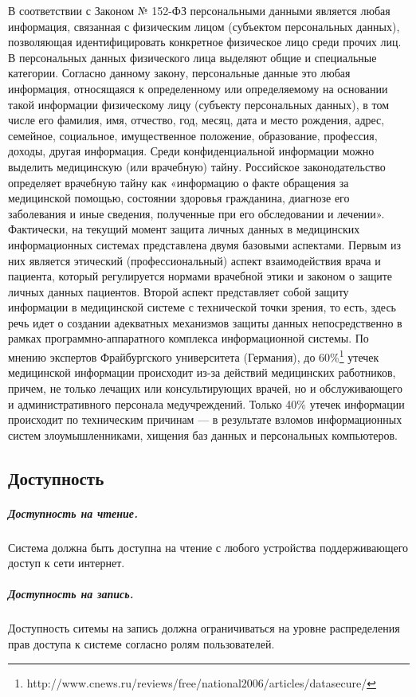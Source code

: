 В соответствии с Законом № 152-ФЗ персональными данными является любая
информация, связанная с физическим лицом (субъектом персональных данных),
позволяющая идентифицировать конкретное физическое лицо среди прочих лиц. В
персональных данных физического лица выделяют общие и специальные категории.
Согласно данному закону, персональные данные это любая информация, относящаяся к
определенному или определяемому на основании такой информации физическому лицу
(субъекту персональных данных), в том числе его фамилия, имя, отчество, год,
месяц, дата и место рождения, адрес, семейное, социальное, имущественное
положение, образование, профессия, доходы, другая информация.
Среди конфиденциальной информации можно выделить медицинскую (или врачебную)
тайну. Российское законодательство определяет врачебную тайну как «информацию о
факте обращения за медицинской помощью, состоянии здоровья гражданина, диагнозе
его заболевания и иные сведения, полученные при его обследовании и лечении».
Фактически, на текущий момент защита личных данных в медицинских информационных
системах представлена  двумя базовыми аспектами.
Первым из них является этический (профессиональный) аспект взаимодействия врача
и пациента, который регулируется нормами врачебной этики и законом о защите
личных данных пациентов.
Второй аспект представляет собой защиту информации в медицинской системе с
технической точки зрения, то есть, здесь речь идет о создании адекватных
механизмов защиты данных непосредственно в рамках программно-аппаратного
комплекса информационной системы.
По мнению экспертов Фрайбургского университета (Германия), до 60\%\footnote{
	http://www.cnews.ru/reviews/free/national2006/articles/datasecure/
} утечек
медицинской информации происходит из-за действий медицинских работников, причем,
не только лечащих или консультирующих врачей, но и обслуживающего и
административного персонала медучреждений. Только 40\% утечек информации
происходит по техническим причинам — в результате взломов информационных систем
злоумышленниками, хищения баз данных и персональных компьютеров.

\subsection{Доступность}
\subparagraph{Доступность на чтение.}
Система должна быть доступна на чтение с любого устройства поддерживающего
доступ к сети интернет.
\subparagraph{Доступность на запись.}
Доступность ситемы на запись должна ограничиваться на уровне распределения прав
доступа к системе согласно ролям пользователей.

